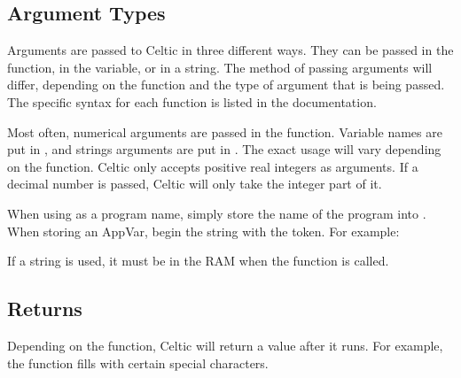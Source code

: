 \documentclass[letterpaper,10pt,english]{sphinxmanual}
\begin{document}
\subsection{Argument Types}
\label{\detokenize{gensyntax:argument-types}}
\sphinxAtStartPar
Arguments are passed to Celtic in three different ways. They can be passed in the  function, in the  variable, or in a string.
The method of passing arguments will differ, depending on the function and the type of argument that is being passed.
The specific syntax for each function is listed in the documentation.

\sphinxAtStartPar
Most often, numerical arguments are passed in the  function. Variable names are put in , and strings arguments are put in . The exact usage will vary depending on the function.
Celtic only accepts positive real integers as arguments. If a decimal number is passed, Celtic will only take the integer part of it.

\sphinxAtStartPar
When using  as a program name, simply store the name of the program into . When storing an AppVar, begin the string with the  token. For example:

\begin{sphinxVerbatim}[commandchars=\\\{\}]
                 
         
\end{sphinxVerbatim}

\sphinxAtStartPar
If a string is used, it must be in the RAM when the function is called.


\subsection{Returns}
\label{\detokenize{gensyntax:returns}}
\sphinxAtStartPar
Depending on the function, Celtic will return a value after it runs. For example, the  function fills  with certain special characters.
\end{document}
